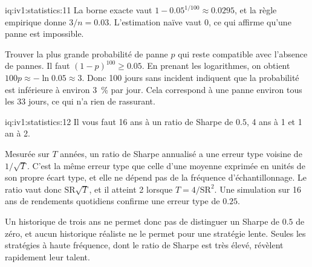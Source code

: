 \begin{solution}{iq:iv1:statistics:11}
La borne exacte vaut $1 - 0.05^{1/100} \approx 0.0295$, et la règle empirique donne $3/n = 0.03$. L'estimation naïve vaut 0, ce qui affirme qu'une panne est impossible.

Trouver la plus grande probabilité de panne $p$ qui reste compatible avec l'absence de pannes. Il faut $(1 - p)^{100} \ge 0.05$. En prenant les logarithmes, on obtient $100p \approx -\ln 0.05 \approx 3$. Donc 100 jours sans incident indiquent que la probabilité est inférieure à environ 3~\% par jour. Cela correspond à une panne environ tous les 33 jours, ce qui n'a rien de rassurant.

\end{solution}

\begin{solution}{iq:iv1:statistics:12}
Il vous faut 16 ans à un ratio de Sharpe de $0.5$, 4 ans à 1 et 1 an à 2.

Mesurée sur $T$ années, un ratio de Sharpe annualisé a une erreur type voisine de $1/\sqrt{T}$. C'est la même erreur type que celle d'une moyenne exprimée en unités de son propre écart type, et elle ne dépend pas de la fréquence d'échantillonnage. Le ratio vaut donc $\mathrm{SR}\sqrt{T}$, et il atteint 2 lorsque $T = 4/\mathrm{SR}^2$. Une simulation sur 16 ans de rendements quotidiens confirme une erreur type de $0.25$.

Un historique de trois ans ne permet donc pas de distinguer un Sharpe de $0.5$ de zéro, et aucun historique réaliste ne le permet pour une stratégie lente. Seules les stratégies à haute fréquence, dont le ratio de Sharpe est très élevé, révèlent rapidement leur talent.

\end{solution}

